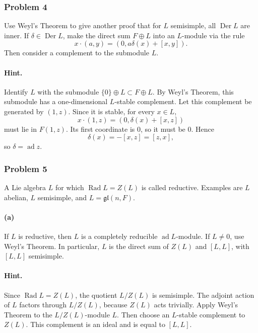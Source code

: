\documentclass[12pt, a4paper]{article}
\begin{document}
\subsubsection{Problem 4}

Use Weyl's Theorem to give another proof that for \(L\) semisimple, all
\(\operatorname{Der}L\) are inner. If \(\delta\in \operatorname{Der}L\), make
the direct sum \(F\oplus L\) into an \(L\)-module via the rule
\[
x\cdot(a,y)=(0,a\delta(x)+[x,y]).
\]
Then consider a complement to the submodule \(L\).

\paragraph{Hint.}
Identify \(L\) with the submodule \(\{0\}\oplus L\subset F\oplus L\). By Weyl's
Theorem, this submodule has a one-dimensional \(L\)-stable complement. Let this
complement be generated by \((1,z)\). Since it is stable, for every \(x\in L\),
\[
x\cdot(1,z)=(0,\delta(x)+[x,z])
\]
must lie in \(F(1,z)\). Its first coordinate is \(0\), so it must be \(0\). Hence
\[
\delta(x)=-[x,z]=[z,x],
\]
so \(\delta=\operatorname{ad}z\).

\subsubsection{Problem 5}

A Lie algebra \(L\) for which \(\operatorname{Rad}L=Z(L)\) is called reductive.
Examples are \(L\) abelian, \(L\) semisimple, and \(L=\mathfrak{gl}(n,F)\).

\paragraph{(a)}
If \(L\) is reductive, then \(L\) is a completely reducible
\(\operatorname{ad}L\)-module. If \(L\neq 0\), use Weyl's Theorem. In particular,
\(L\) is the direct sum of \(Z(L)\) and \([L,L]\), with \([L,L]\) semisimple.

\paragraph{Hint.}
Since \(\operatorname{Rad}L=Z(L)\), the quotient \(L/Z(L)\) is semisimple.
The adjoint action of \(L\) factors through \(L/Z(L)\), because \(Z(L)\) acts
trivially. Apply Weyl's Theorem to the \(L/Z(L)\)-module \(L\). Then choose an
\(L\)-stable complement to \(Z(L)\). This complement is an ideal and is equal to
\([L,L]\).
\end{document}
